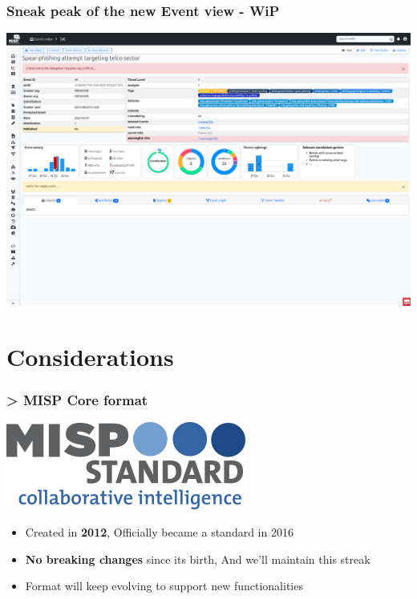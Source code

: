 \begin{frame}
    \frametitle{Sneak peak of the new Event view - WiP}
    \begin{center}
        \includegraphics[width=1.0\linewidth]{pictures/event-view.png}
    \end{center}
\end{frame}


\section{Considerations}
\begin{frame}
    \frametitle{> MISP Core format}
    \vspace{-5em}
    \begin{center}
        \includegraphics[width=0.35\linewidth]{pictures/misp-standard.png}
    \end{center}
    \vspace{1em}
    \begin{itemize}
        \item Created in \textbf{2012}, Officially became a standard in 2016
        \item \textbf{No breaking changes} since its birth, And we'll maintain this streak
        \item Format will keep evolving to support new functionalities
    \end{itemize}
\end{frame}

